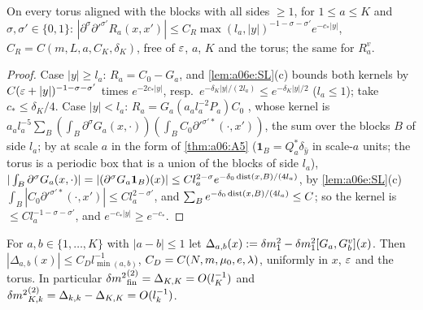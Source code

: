 \begin{lemma}\label{lem:a06e:RK}
On every torus aligned with the blocks with all sides $\ge1$, for $1\le a\le K$ and $\sigma,\sigma'\in\{0,1\}$: $|\partial^\sigma\partial'^{\sigma'}R_a(x,x')|\le C_{R}\max(l_a,|y|)^{-1-\sigma-\sigma'}e^{-c_*|y|}$, $C_R=C(m,L,a,C_K,\delta_K)$, free of $\varepsilon$, $a$, $K$ and the torus; the same for $R^v_a$.
\end{lemma}

\begin{proof}
Case $|y|\ge l_a$: $R_a=C_0-G_a$, and \cref{lem:a06e:SL}(c) bounds both kernels by $C(\varepsilon+|y|)^{-1-\sigma-\sigma'}$ times $e^{-2c_*|y|}$, resp.\ $e^{-\delta_K|y|/(2l_a)}\le e^{-\delta_K|y|/2}$ ($l_a\le1$); take $c_*\le\delta_K/4$. Case $|y|<l_a$: $R_a=G_a(a_al_a^{-2}P_a)C_0$ \cite[(1.25)]{Ba3}, whose kernel is $a_al_a^{-5}\sum_B(\int_B\partial^\sigma G_a(x,\cdot))(\int_BC_0\partial'^{\sigma'*}(\cdot,x'))$, the sum over the blocks $B$ of side $l_a$; by \cite[(2.35)]{Ba4} at scale $a$ in the form of \cref{thm:a06:A5} ($\mathbf 1_B=Q_a^*\delta_{\hat y}$ in scale-$a$ units; the torus is a periodic box that is a union of the blocks of side $l_a$), $|\int_B\partial^\sigma G_a(x,\cdot)|=|(\partial^\sigma G_a\mathbf 1_B)(x)|\le Cl_a^{2-\sigma}e^{-\delta_0\operatorname{dist}(x,B)/(4l_a)}$, by \cref{lem:a06e:SL}(c) $\int_B|C_0\partial'^{\sigma'*}(\cdot,x')|\le Cl_a^{2-\sigma'}$, and $\sum_Be^{-\delta_0\operatorname{dist}(x,B)/(4l_a)}\le C$; so the kernel is $\le Cl_a^{-1-\sigma-\sigma'}$, and $e^{-c_*|y|}\ge e^{-c_*}$.
\end{proof}

\begin{proposition}\label{prop:a06e:DM1}
For $a,b\in\{1,\dots,K\}$ with $|a-b|\le1$ let $\Delta_{a,b}(x):=\delta m^2_1-\delta m^2_1[G_a,G^v_b](x)$. Then $|\Delta_{a,b}(x)|\le C_Dl_{\min(a,b)}^{-1}$, $C_D=C(N,m,\mu_0,e,\lambda)$, uniformly in $x$, $\varepsilon$ and the torus. In particular ${\delta m^2}^{(2)}_{\mathrm{fin}}=\Delta_{K,K}=O(l_K^{-1})$ and ${\delta m^2}^{(2)}_{K,k}=\Delta_{k,k}-\Delta_{K,K}=O(l_k^{-1})$.
\end{proposition}

